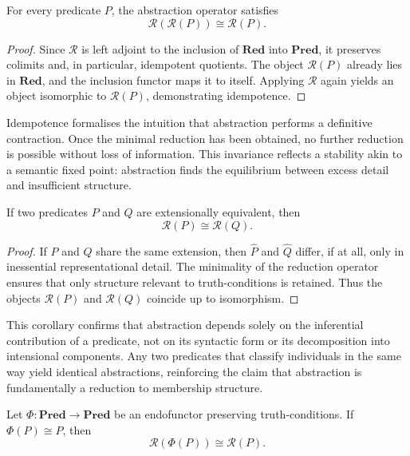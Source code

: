 \documentclass[12pt,letterpaper]{article}
\begin{document}
\begin{corollary}
For every predicate $P$, the abstraction operator satisfies
\[
\mathcal{R}(\mathcal{R}(P)) \cong \mathcal{R}(P).
\]
\end{corollary}

\begin{proof}
Since $\mathcal{R}$ is left adjoint to the inclusion of $\mathbf{Red}$ into $\mathbf{Pred}$, it preserves colimits and, in particular, idempotent quotients. The object $\mathcal{R}(P)$ already lies in $\mathbf{Red}$, and the inclusion functor maps it to itself. Applying $\mathcal{R}$ again yields an object isomorphic to $\mathcal{R}(P)$, demonstrating idempotence.
\end{proof}

Idempotence formalises the intuition that abstraction performs a definitive contraction. Once the minimal reduction has been obtained, no further reduction is possible without loss of information. This invariance reflects a stability akin to a semantic fixed point: abstraction finds the equilibrium between excess detail and insufficient structure.

\begin{corollary}
If two predicates $P$ and $Q$ are extensionally equivalent, then
\[
\mathcal{R}(P) \cong \mathcal{R}(Q).
\]
\end{corollary}

\begin{proof}
If $P$ and $Q$ share the same extension, then $\hat{P}$ and $\hat{Q}$ differ, if at all, only in inessential representational detail. The minimality of the reduction operator ensures that only structure relevant to truth-conditions is retained. Thus the objects $\mathcal{R}(P)$ and $\mathcal{R}(Q)$ coincide up to isomorphism.
\end{proof}

This corollary confirms that abstraction depends solely on the inferential contribution of a predicate, not on its syntactic form or its decomposition into intensional components. Any two predicates that classify individuals in the same way yield identical abstractions, reinforcing the claim that abstraction is fundamentally a reduction to membership structure.

\begin{corollary}
Let $\Phi : \mathbf{Pred} \to \mathbf{Pred}$ be an endofunctor preserving truth-conditions. If $\Phi(P) \cong P$, then
\[
\mathcal{R}(\Phi(P)) \cong \mathcal{R}(P).
\]
\end{corollary}
\end{document}
